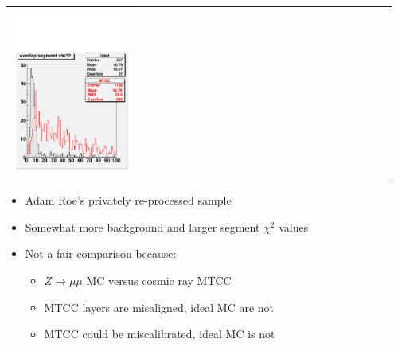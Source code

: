 \documentclass[compress]{beamer}
\begin{document}
\begin{frame}
\begin{tabular}{p{0.32\linewidth} p{0.32\linewidth} p{0.32\linewidth}}
\includegraphics[height=\linewidth]{overlap_chi2.pdf} \\
\end{tabular}

\vfill
\begin{itemize}\setlength{\itemsep}{0.2 cm}
\item Adam Roe's privately re-processed sample
\item Somewhat more background and larger segment $\chi^2$ values
\item Not a fair comparison because:
\begin{itemize}\setlength{\itemsep}{0.1 cm}
\item $Z\to\mu\mu$ MC versus cosmic ray MTCC
\item MTCC layers are misaligned, ideal MC are not
\item MTCC could be miscalibrated, ideal MC is not
\end{itemize}
\end{itemize}
\end{frame}
\end{document}
